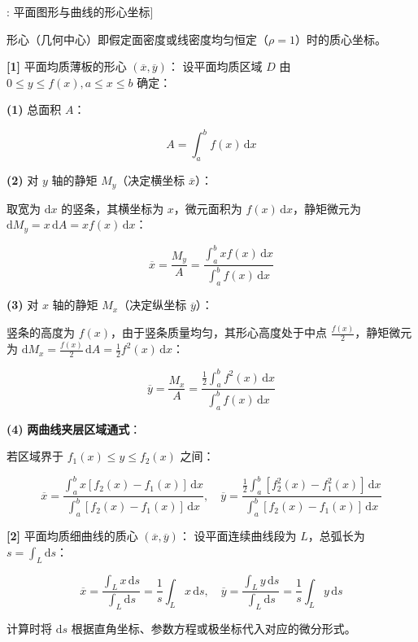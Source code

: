 \documentclass[11pt,a4paper,UTF8]{ctexart}
\begin{document}
\begin{thmbox}[公式[9]: 平面图形与曲线的形心坐标]

形心（几何中心）即假定面密度或线密度均匀恒定（$\rho = 1$）时的质心坐标。

\textbf{[1]} 平面均质薄板的形心 $(\overline{x}, \overline{y})$：
设平面均质区域 $D$ 由 $0 \leqslant y \leqslant f(x), a \leqslant x \leqslant b$ 确定：

\textbf{(1)}  \textit{}总面积 $A$\textit{}：


\begin{equation*}
A = \int_a^b f(x)\,\mathrm{d}x
\end{equation*}


\textbf{(2)}  \textit{}对 $y$ 轴的静矩 $M_y$（决定横坐标 $\overline{x}$）\textit{}：

取宽为 $\mathrm{d}x$ 的竖条，其横坐标为 $x$，微元面积为 $f(x)\,\mathrm{d}x$，静矩微元为 $\mathrm{d}M_y = x\,\mathrm{d}A = x f(x)\,\mathrm{d}x$：


\begin{equation*}
\overline{x} = \frac{M_y}{A} = \frac{\int_a^b x f(x)\,\mathrm{d}x}{\int_a^b f(x)\,\mathrm{d}x}
\end{equation*}


\textbf{(3)}  \textit{}对 $x$ 轴的静矩 $M_x$（决定纵坐标 $\overline{y}$）\textit{}：

竖条的高度为 $f(x)$，由于竖条质量均匀，其形心高度处于中点 $\frac{f(x)}{2}$，静矩微元为 $\mathrm{d}M_x = \frac{f(x)}{2}\,\mathrm{d}A = \frac{1}{2}f^2(x)\,\mathrm{d}x$：


\begin{equation*}
\overline{y} = \frac{M_x}{A} = \frac{\frac{1}{2}\int_a^b f^2(x)\,\mathrm{d}x}{\int_a^b f(x)\,\mathrm{d}x}
\end{equation*}


\textbf{(4)}  \textbf{两曲线夹层区域通式}：

若区域界于 $f_1(x) \leqslant y \leqslant f_2(x)$ 之间：


\begin{equation*}
\overline{x} = \frac{\int_a^b x [f_2(x) - f_1(x)]\,\mathrm{d}x}{\int_a^b [f_2(x) - f_1(x)]\,\mathrm{d}x}, \quad \overline{y} = \frac{\frac{1}{2}\int_a^b [f_2^2(x) - f_1^2(x)]\,\mathrm{d}x}{\int_a^b [f_2(x) - f_1(x)]\,\mathrm{d}x}
\end{equation*}


\textbf{[2]} 平面均质细曲线的质心 $(\overline{x}, \overline{y})$：
设平面连续曲线段为 $L$，总弧长为 $s = \int_L \mathrm{d}s$：


\begin{equation*}
\overline{x} = \frac{\int_L x\,\mathrm{d}s}{\int_L \mathrm{d}s} = \frac{1}{s}\int_L x\,\mathrm{d}s, \quad \overline{y} = \frac{\int_L y\,\mathrm{d}s}{\int_L \mathrm{d}s} = \frac{1}{s}\int_L y\,\mathrm{d}s
\end{equation*}


计算时将 $\mathrm{d}s$ 根据直角坐标、参数方程或极坐标代入对应的微分形式。
\end{thmbox}
\end{document}
